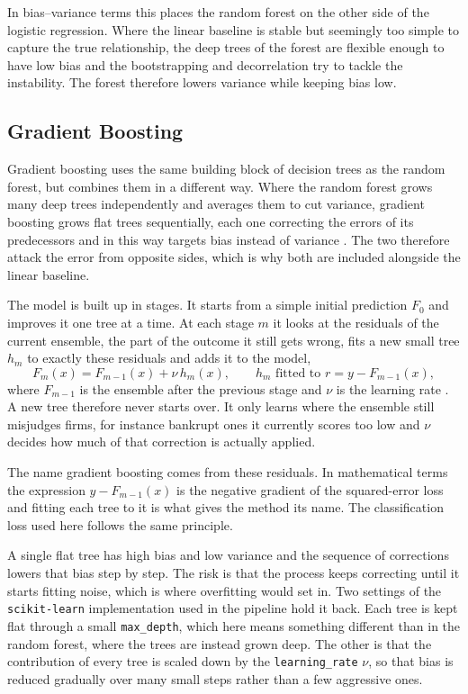 In bias--variance terms this places the random forest on the other side of the
logistic regression. Where the linear baseline is stable but seemingly too simple to capture
the true relationship, the deep trees of the forest are flexible enough to have low
bias and the bootstrapping and decorrelation try to tackle the instability. 
The forest therefore lowers variance while keeping bias low.

\subsection{Gradient Boosting}
\label{subsec:gb}

Gradient boosting uses the same building block of decision trees as the random forest,
but combines them in a different way. Where the random forest grows many
deep trees independently and averages them to cut variance, gradient boosting grows
flat trees sequentially, each one correcting the errors of its predecessors 
and in this way targets bias instead of variance \parencite{friedman2001}. The two therefore
attack the error from opposite sides, which is why both are included
alongside the linear baseline.

The model is built up in stages. It starts from a simple initial prediction $F_0$
and improves it one tree at a time. At each stage $m$ it looks at the residuals of
the current ensemble, the part of the outcome it still gets wrong, fits a new small
tree $h_m$ to exactly these residuals and adds it to the model,
\begin{equation}
  F_m(x) = F_{m-1}(x) + \nu\, h_m(x), \qquad
  h_m \text{ fitted to } r = y - F_{m-1}(x),
  \label{eq:gb}
\end{equation}
where $F_{m-1}$ is the ensemble after the previous stage and $\nu$ is the learning
rate \parencite[Eq.~36, p.~1203]{friedman2001}. A new tree therefore never starts
over. It only learns where the ensemble still misjudges firms, for instance
bankrupt ones it currently scores too low and $\nu$ decides how much of that
correction is actually applied.

The name gradient boosting comes from these residuals. In mathematical terms the
expression $y - F_{m-1}(x)$ is the negative gradient of the squared-error loss and
fitting each tree to it is what gives the method its name. The classification loss
used here follows the same principle.

A single flat tree has high bias and low variance and the sequence of corrections
lowers that bias step by step. The risk is that the process keeps correcting until
it starts fitting noise, which is where overfitting would set in. Two settings of the
\texttt{scikit-learn} implementation used in the pipeline hold it back. Each tree is
kept flat through a small \texttt{max\_depth}, which here means something different
than in the random forest, where the trees are instead grown deep. The other is that the
contribution of every tree is scaled down by the \texttt{learning\_rate} $\nu$, so
that bias is reduced gradually over many small steps rather than a few aggressive
ones.

